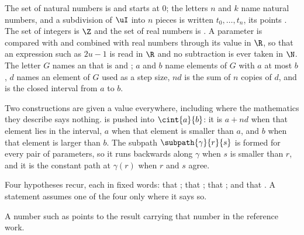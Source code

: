 The set of natural numbers is  and starts at $0$; the
letters $n$ and $k$ name natural numbers, and a subdivision of $\uI$ into $n$
pieces is written $t_{0}, \dots, t_{n}$, its points
.  The set of integers is $\Z$ and the set of
real numbers is .  A parameter is compared with and
combined with real numbers through its value in $\R$, so that an expression such
as $2u - 1$ is read in $\R$ and no subtraction is ever taken in $\N$.  The
letter $G$ names an  that is
 and
; $a$ and $b$
name elements of $G$ with $a$ at most $b$, $d$ names an element of $G$ used as a
step size, $nd$ is the sum of $n$ copies of $d$, and
 is the closed interval from $a$ to $b$.

Two constructions are given a value everywhere, including where the mathematics
they describe says nothing.   is pushed into $\cint{a}{b}$: it is $a + nd$ when
that element lies in the interval, $a$ when that element is smaller than $a$,
and $b$ when that element is larger than $b$.  The subpath
$\subpath{\gamma}{r}{s}$ is formed for every pair of parameters, so it runs
backwards along $\gamma$ when $s$ is smaller than $r$, and it is the constant
path at $\gamma(r)$ when $r$ and $s$ agree.

Four hypotheses recur, each in fixed words: that \hypCoverTwo*; that
\hypCoverFamily*; that \hypPathConnected*; and that \hypBasepoint*.  A
statement assumes one of the four only where it says so.

A number such as  points to the result carrying that
number in the reference work.
